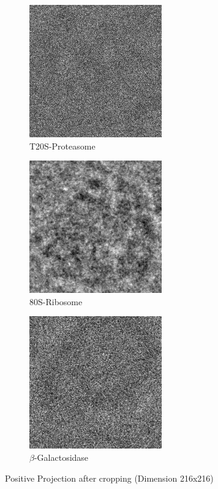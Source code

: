 \documentclass{report}
\begin{document}
\begin{figure}[h]
\centering
\begin{subfigure}{.5\textwidth}
\centering
\includegraphics[width=0.5\linewidth]{pos-EM-10025.png}
\captionsetup{justification=centering}
\caption{ T20S-Proteasome }
\end{subfigure} 
\begin{subfigure}{.48\textwidth}
\centering
\includegraphics[width=0.5\linewidth]{pos-EM-10028.png}
\captionsetup{justification=centering}
\caption{ 80S-Ribosome }
\end{subfigure}
\begin{subfigure}{.5\textwidth}
\centering
\includegraphics[width=0.5\linewidth]{pos-EM-10012.png}
\captionsetup{justification=centering}
\caption{$\beta$-Galactosidase }
\end{subfigure}
\caption{ Positive Projection after cropping (Dimension 216x216)}
\label{fig:Positive-Projection}
\end{figure}
\end{document}

